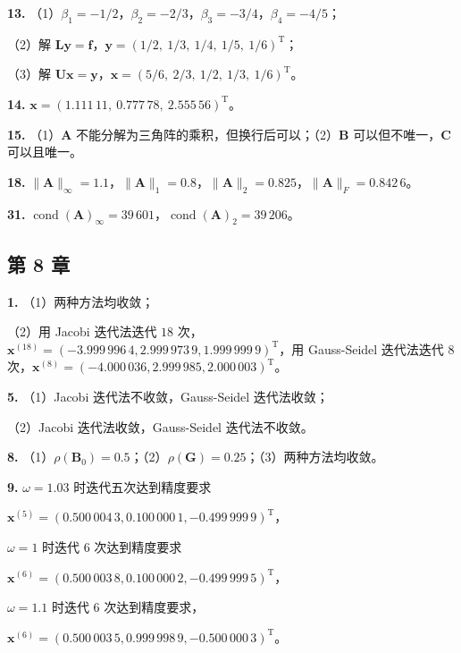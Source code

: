 \textbf{13.} （1）\(\beta_1=-1/2\)，\(\beta_2=-2/3\)，\(\beta_3=-3/4\)，\(\beta_4=-4/5\)；

（2）解 \(\boldsymbol{L}\boldsymbol{y}=\boldsymbol{f}\)，\(\boldsymbol{y}=(1/2,\ 1/3,\ 1/4,\ 1/5,\ 1/6)^{\mathrm{T}}\)；

（3）解 \(\boldsymbol{U}\boldsymbol{x}=\boldsymbol{y}\)，\(\boldsymbol{x}=(5/6,\ 2/3,\ 1/2,\ 1/3,\ 1/6)^{\mathrm{T}}\)。

\textbf{14.} \(\boldsymbol{x}=(1.111\,11,\ 0.777\,78,\ 2.555\,56)^{\mathrm{T}}\)。

\textbf{15.} （1）\(\boldsymbol{A}\) 不能分解为三角阵的乘积，但换行后可以；（2）\(\boldsymbol{B}\) 可以但不唯一，\(\boldsymbol{C}\) 可以且唯一。

\textbf{18.} \(\|\boldsymbol{A}\|_{\infty}=1.1\)，\(\|\boldsymbol{A}\|_1=0.8\)，\(\|\boldsymbol{A}\|_2=0.825\)，\(\|\boldsymbol{A}\|_F=0.842\,6\)。

\textbf{31.} \(\operatorname{cond}(\boldsymbol{A})_{\infty}=39\,601\)，\(\operatorname{cond}(\boldsymbol{A})_2=39\,206\)。

\subsection{第 8 章}\label{back-ux7b2c-8-ux7ae0}

\textbf{1.} （1）两种方法均收敛；

（2）用 Jacobi 迭代法迭代 \(18\) 次，\(\boldsymbol{x}^{(18)}=(-3.999\,996\,4,2.999\,973\,9,1.999\,999\,9)^{\mathrm{T}}\)，用 Gauss-Seidel 迭代法迭代 \(8\) 次，\(\boldsymbol{x}^{(8)}=(-4.000\,036,2.999\,985,2.000\,003)^{\mathrm{T}}\)。

\textbf{5.} （1）Jacobi 迭代法不收敛，Gauss-Seidel 迭代法收敛；

（2）Jacobi 迭代法收敛，Gauss-Seidel 迭代法不收敛。

\textbf{8.} （1）\(\rho(\boldsymbol{B}_0)=0.5\)；（2）\(\rho(\boldsymbol{G})=0.25\)；（3）两种方法均收敛。

\textbf{9.} \(\omega=1.03\) 时迭代五次达到精度要求

\(\boldsymbol{x}^{(5)}=(0.500\,004\,3,0.100\,000\,1,-0.499\,999\,9)^{\mathrm{T}}\)，

\(\omega=1\) 时迭代 \(6\) 次达到精度要求

\(\boldsymbol{x}^{(6)}=(0.500\,003\,8,0.100\,000\,2,-0.499\,999\,5)^{\mathrm{T}}\)，

\(\omega=1.1\) 时迭代 \(6\) 次达到精度要求，

\(\boldsymbol{x}^{(6)}=(0.500\,003\,5,0.999\,998\,9,-0.500\,000\,3)^{\mathrm{T}}\)。

